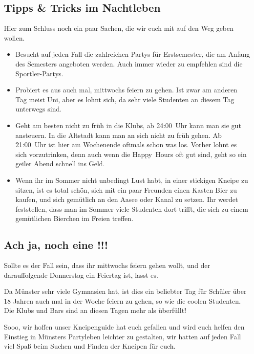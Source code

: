 \begin{multicols*}{2}
\subsection*{Tipps \& Tricks im Nachtleben}
Hier zum Schluss noch ein paar Sachen, die wir euch mit auf den Weg geben wollen.
\begin{itemize}
\item Besucht auf jeden Fall die zahlreichen Partys für Erstsemester, die am Anfang des Semesters angeboten werden. Auch immer wieder zu empfehlen sind die Sportler-Partys.
\item Probiert es aus auch mal, mittwochs feiern zu gehen. Ist zwar am anderen Tag meist Uni, aber es lohnt sich, da sehr viele Studenten an diesem Tag unterwegs sind.
\item Geht am besten nicht zu früh in die Klubs, ab 24:00~Uhr kann man sie gut ansteuern. In die Altstadt kann man an sich nicht zu früh gehen. Ab 21:00~Uhr ist hier am Wochenende oftmals schon was los. Vorher lohnt es sich vorzutrinken, denn auch wenn die Happy~Hours oft gut sind, geht so ein geiler Abend schnell ins Geld.
\item Wenn ihr im Sommer nicht unbedingt Lust habt, in einer stickigen Kneipe zu sitzen, ist es total schön, sich mit ein paar Freunden einen Kasten Bier zu kaufen, und sich gemütlich an den Aasee oder Kanal zu setzen. Ihr werdet feststellen, dass man im Sommer viele Studenten dort trifft, die sich zu einem gemütlichen Bierchen im Freien treffen.
\end{itemize}

\subsection*{Ach ja, noch eine \underline{}!!!}
Sollte es der Fall sein, dass ihr mittwochs feiern gehen wollt, und der darauffolgende Donnerstag ein Feiertag ist, lasst es.

Da Münster sehr viele Gymnasien hat, ist dies ein beliebter Tag für Schüler über 18 Jahren auch mal in der Woche feiern zu gehen, so wie die coolen Studenten. Die Klubs und Bars sind an diesen Tagen mehr als überfüllt!

Sooo, wir hoffen unser Kneipenguide hat euch gefallen und wird euch helfen den Einstieg in Münsters Partyleben leichter zu gestalten, wir hatten auf jeden Fall viel Spaß beim Suchen und Finden der Kneipen für euch.

\end{multicols*}
